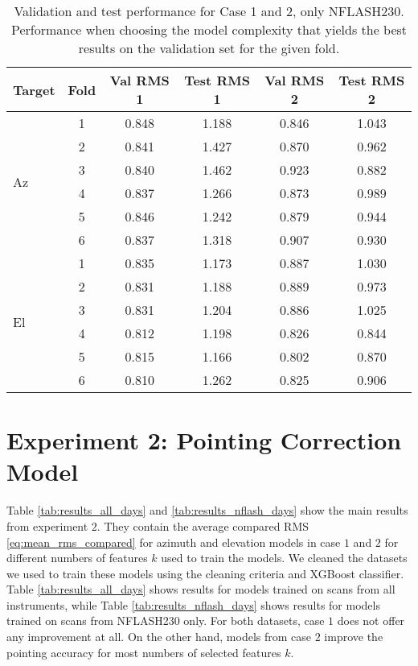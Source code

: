\begin{table}
    \centering
    \label{tab:results_minval_val_test_days_04_n230}
    \caption{Validation and test performance for Case 1 and 2, only NFLASH230.
    Performance when choosing the model complexity that yields the best results on the validation set for the given fold.}
    \begin{tabular}{lccccc}
        \toprule
        Target & Fold & Val RMS 1 &  Test RMS 1 &  Val RMS 2 &  Test RMS 2 \\
        \midrule
        \multirow{6}{*}{Az} & 1 &  0.848 &       1.188 &      0.846 &       1.043 \\
                            & 2 &  0.841 &       1.427 &      0.870 &       0.962 \\
                            & 3 &  0.840 &       1.462 &      0.923 &       0.882 \\
                            & 4 &  0.837 &       1.266 &      0.873 &       0.989 \\
                            & 5 &  0.846 &       1.242 &      0.879 &       0.944 \\
                            & 6 &  0.837 &       1.318 &      0.907 &       0.930 \\
        \multirow{6}{*}{El} & 1 &  0.835 &       1.173 &      0.887 &       1.030 \\
                            & 2 &  0.831 &       1.188 &      0.889 &       0.973 \\
                            & 3 &  0.831 &       1.204 &      0.886 &       1.025 \\
                            & 4 &  0.812 &       1.198 &      0.826 &       0.844 \\
                            & 5 &  0.815 &       1.166 &      0.802 &       0.870 \\
                            & 6 &  0.810 &       1.262 &      0.825 &       0.906 \\
        \bottomrule
    \end{tabular}
\end{table}


\section{Experiment 2: Pointing Correction Model}
Table \ref{tab:results_all_days} and \ref{tab:results_nflash_days} show the main results from experiment $2$.
They contain the average compared RMS \eqref{eq:mean_rms_compared} for azimuth and elevation models in case $1$ and $2$ for different numbers of features $k$ used to train the models.
We cleaned the datasets we used to train these models using the cleaning criteria and XGBoost classifier.
Table \ref{tab:results_all_days} shows results for models trained on scans from all instruments, while Table \ref{tab:results_nflash_days} shows results for models
trained on scans from NFLASH230 only. For both datasets, case $1$ does not offer any improvement at all.
On the other hand, models from case $2$ improve the pointing accuracy for most numbers of selected features $k$.

